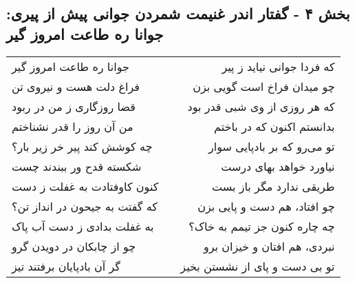 \begin{center}
\section*{بخش ۴ - گفتار اندر غنیمت شمردن جوانی پیش از پیری: جوانا ره طاعت امروز گیر}
\label{sec:004}
\begin{longtable}{l p{0.5cm} r}
جوانا ره طاعت امروز گیر
&&
که فردا جوانی نیاید ز پیر
\\
فراغ دلت هست و نیروی تن
&&
چو میدان فراخ است گویی بزن
\\
قضا روزگاری ز من در ربود
&&
که هر روزی از وی شبی قدر بود
\\
من آن روز را قدر نشناختم
&&
بدانستم اکنون که در باختم
\\
چه کوشش کند پیر خر زیر بار؟
&&
تو می‌رو که بر بادپایی سوار
\\
شکسته قدح ور ببندند چست
&&
نیاورد خواهد بهای درست
\\
کنون کاوفتادت به غفلت ز دست
&&
طریقی ندارد مگر باز بست
\\
که گفتت به جیحون در انداز تن؟
&&
چو افتاد، هم دست و پایی بزن
\\
به غفلت بدادی ز دست آب پاک
&&
چه چاره کنون جز تیمم به خاک؟
\\
چو از چابکان در دویدن گرو
&&
نبردی، هم افتان و خیزان برو
\\
گر آن بادپایان برفتند تیز
&&
تو بی دست و پای از نشستن بخیز
\\
\end{longtable}
\end{center}

